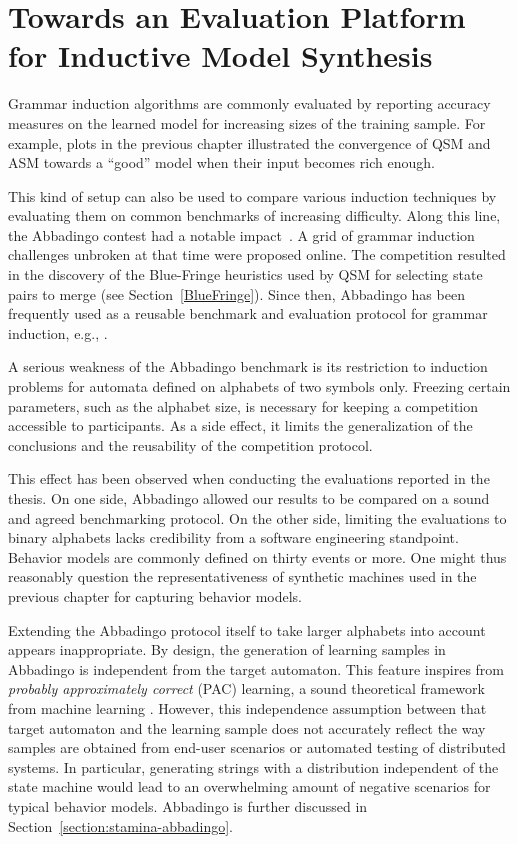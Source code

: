 \chapter{Towards an Evaluation Platform for Inductive Model Synthesis\label{chapter:stamina}}

Grammar induction algorithms are commonly evaluated by reporting accuracy measures on the learned model for increasing sizes of the training sample. For example, plots in the previous chapter illustrated the convergence of QSM and ASM towards a ``good'' model when their input becomes rich enough. 

This kind of setup can also be used to compare various induction techniques by evaluating them on common benchmarks of increasing difficulty. Along this line, the Abbadingo contest had a notable impact~\cite{Lang:1998}. A grid of grammar induction challenges unbroken at that time were proposed online. The competition resulted in the discovery of the Blue-Fringe heuristics used by QSM for selecting state pairs to merge (see Section~\ref{BlueFringe}). Since then, Abbadingo has been frequently used as a reusable benchmark and evaluation protocol for grammar induction, e.g., \cite{Lucas:2003, Bongard:2005, Lucas:2005, Adriaans:2006, Dupont:2008, Lambeau:2008, Heule:2010}.

A serious weakness of the Abbadingo benchmark is its restriction to induction problems for automata defined on alphabets of two symbols only. Freezing certain parameters, such as the alphabet size, is necessary for keeping a competition accessible to participants. As a side effect, it limits the generalization of the conclusions and the reusability of the competition protocol. 

This effect has been observed when conducting the evaluations reported in the thesis. On one side, Abbadingo allowed our results to be compared on a sound and agreed benchmarking protocol. On the other side, limiting the evaluations to binary alphabets lacks credibility from a software engineering standpoint. Behavior models are commonly defined on thirty events or more. One might thus reasonably question the representativeness of synthetic machines used in the previous chapter for capturing behavior models.

Extending the Abbadingo protocol itself to take larger alphabets into account appears inappropriate. By design, the generation of learning samples in Abbadingo is independent from the target automaton. This feature inspires from \emph{probably approximately correct} (PAC) learning, a sound theoretical framework from machine learning \cite{Valiant:1984}. However, this independence assumption between that target automaton and the learning sample does not accurately reflect the way samples are obtained from end-user scenarios or automated testing of distributed systems. In particular, generating strings with a distribution independent of the state machine would lead to an overwhelming amount of negative scenarios for typical behavior models. Abbadingo is further discussed in Section~\ref{section:stamina-abbadingo}.

